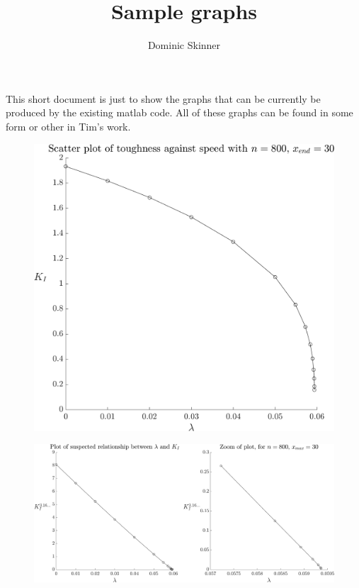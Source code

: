\documentclass{article}
\begin{document}
\title{Sample graphs}
\author{Dominic Skinner}
\maketitle
This short document is just to show the graphs that can be
currently be produced by the existing matlab code. All of these
graphs can be found in some form or other in Tim's work.
\begin{figure}[ht]\centering
\includegraphics[scale=0.35]{K-lambda.png}
\end{figure}
\begin{figure}[ht]\centering
\includegraphics[scale=0.28]{sus-relation.png}
\end{figure}
\clearpage
\end{document}

